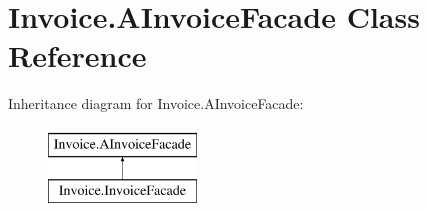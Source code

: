 \hypertarget{class_invoice_1_1_a_invoice_facade}{}\section{Invoice.\+A\+Invoice\+Facade Class Reference}
\label{class_invoice_1_1_a_invoice_facade}
Inheritance diagram for Invoice.\+A\+Invoice\+Facade\+:\begin{figure}[H]
\begin{center}
\leavevmode
\includegraphics[height=2.000000cm]{class_invoice_1_1_a_invoice_facade}
\end{center}
\end{figure}
